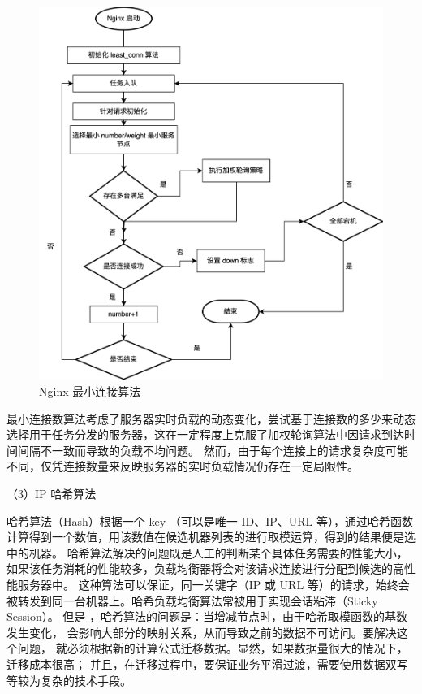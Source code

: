 \begin{figure}[htb]
	\centering
	\includegraphics[width=\textwidth]{figures/least-flowchart.png}
	\caption{Nginx 最小连接算法}
	\label{minlinkconnection}
\end{figure}

最小连接数算法考虑了服务器实时负载的动态变化，尝试基于连接数的多少来动态选择用于任务分发的服务器，这在一定程度上克服了加权轮询算法中因请求到达时间间隔不一致而导致的负载不均问题。
然而，由于每个连接上的请求复杂度可能不同，仅凭连接数量来反映服务器的实时负载情况仍存在一定局限性。

（3）IP 哈希算法

哈希算法（Hash）根据一个 key （可以是唯一 ID、IP、URL 等），通过哈希函数计算得到一个数值，用该数值在候选机器列表的进行取模运算，得到的结果便是选中的机器\cite{邱亚飞2021哈希算法的实现与验证}。
哈希算法解决的问题既是人工的判断某个具体任务需要的性能大小，如果该任务消耗的性能较多，负载均衡器将会对该请求连接进行分配到候选的高性能服务器中。
这种算法可以保证，同一关键字（IP 或 URL 等）的请求，始终会被转发到同一台机器上。哈希负载均衡算法常被用于实现会话粘滞（Sticky Session）。
但是 ，哈希算法的问题是：当增减节点时，由于哈希取模函数的基数发生变化，
会影响大部分的映射关系，从而导致之前的数据不可访问。要解决这个问题，
就必须根据新的计算公式迁移数据。显然，如果数据量很大的情况下，迁移成本很高；
并且，在迁移过程中，要保证业务平滑过渡，需要使用数据双写等较为复杂的技术手段。

